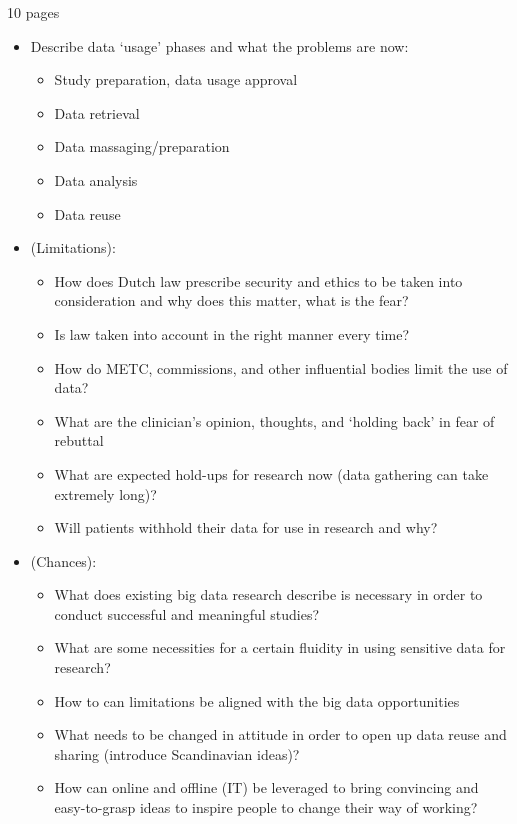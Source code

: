 10 pages

\begin{itemize}
	\item Describe data `usage' phases and what the problems are now:
	\begin{itemize}
		\item Study preparation, data usage approval
		\item Data retrieval
		\item Data massaging/preparation
		\item Data analysis
		\item Data reuse
	\end{itemize}
	
	\item (Limitations):
	\begin{itemize}
		\item How does Dutch law prescribe security and ethics to be taken into consideration and why does this matter, what is the fear?
		\item Is law taken into account in the right manner every time?
		\item How do METC, commissions, and other influential bodies limit the use of data?
		\item What are the clinician's opinion, thoughts, and `holding back' in fear of rebuttal
		\item What are expected hold-ups for research now (data gathering can take extremely long)?
		\item Will patients withhold their data for use in research and why?
	\end{itemize}
	\item (Chances):
	\begin{itemize}
		\item What does existing big data research describe is necessary in order to conduct successful and meaningful studies?
		\item What are some necessities for a certain fluidity in using sensitive data for research?
		\item How to can limitations be aligned with the big data opportunities
		\item What needs to be changed in attitude in order to open up data reuse and sharing (introduce Scandinavian ideas)?
		\item How can online and offline (IT) be leveraged to bring convincing and easy-to-grasp ideas to inspire people to change their way of working?
	\end{itemize}
\end{itemize}